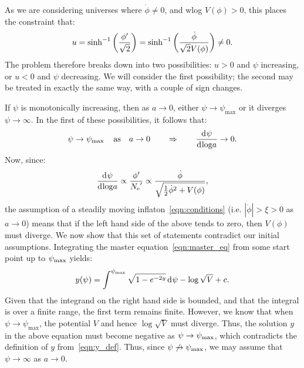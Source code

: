 As we are considering universes where \(\dot{\phi}\ne 0\), and wlog \(V(\phi)>0\), this places the constraint that:
\begin{equation}
  u 
  = 
  \sinh^{-1}\left(\frac{{{\phi}^\prime}}{\sqrt 2}\right) 
  = 
  \sinh^{-1}\left(\frac{\dot\phi}{\sqrt 2 V(\phi)}\right)
  \ne 
  0.
\end{equation}
The problem therefore breaks down into two possibilities: \(u>0\) and \(\psi\) increasing, or \(u<0\) and \(\psi\) decreasing.
We will consider the first possibility; the second may be treated in exactly the same way, with a couple of sign changes.  

If \(\psi\) is monotonically increasing, then as \(a\to0\), either \(\psi\to\psi_{\max{}}\) or it diverges \(\psi\to\infty\). In the first of these possibilities, it follows that:
\begin{equation}
    \psi \to \psi_{\max{}}\quad \text{as}\quad a\to 0 \qquad \Rightarrow \qquad \frac{\operatorname{d}^{}\!{\psi}}{\operatorname{d}^{}\!{\log} a} \to 0.
\end{equation}
Now, since:
\begin{equation}
    \frac{\operatorname{d}^{}\!{\psi}}{\operatorname{d}^{}\!{\log} a} \propto \frac{{{\phi}^\prime}}{{{N_\mathrm{e}}^\prime}} \propto \frac{\dot{\phi}}{\sqrt{\frac{1}{2}\dot{\phi}^2 + V(\phi)}},
\end{equation}
the assumption of a steadily moving inflaton~\eqref{eqn:conditions} (i.e. \(|\dot\phi| > \xi > 0\) as \(a\to0\)) means that if  the left hand side of the above tends to zero, then \(V(\phi)\) must diverge. We now show that this set of statements contradict our initial assumptions.
Integrating the master equation~\eqref{eqn:master_eq} from some start point up to \(\psi_{\mathrm{max}}\) yields:
\begin{equation}
  y(\psi) = \int^{\psi_{\mathrm{max}}} \sqrt{1-e^{-2y}} \operatorname{d}^{}\!{\psi} - \log\sqrt{V} + c.
\end{equation}
Given that the integrand on the right hand side is bounded, and that the integral is over a finite range, the first term remains finite. However, we know that when \(\psi\to\psi_{\max{}}\), the potential \(V\) and hence \(\log\sqrt V\) must diverge. Thus, the solution \(y\) in the above equation must become negative as \(\psi\to\psi_{\mathrm{max}}\), which contradicts the definition of \(y\) from~\eqref{eqn:y_def}.
Thus,  since \(\psi\not\to\psi_{\mathrm{max}}\), we may assume that  \(\psi\to\infty\) as \(a\to0\).

